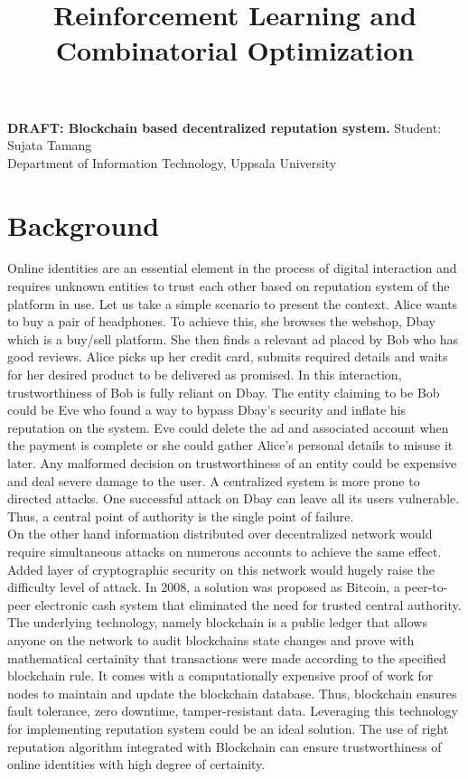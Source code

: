 \documentclass[a4paper,11pt,dvipsnames]{article}
\title{Reinforcement Learning and Combinatorial Optimization}
\begin{document}
	\begin{center}	
		\textbf{\huge{DRAFT: Blockchain based decentralized reputation system.}}
		\newline
		\textsf{\large{Student: Sujata Tamang}}\\
		\textsf{\large{Department of Information Technology, Uppsala University}}
	\end{center}
	
	\section*{Background}
	Online identities are an essential element in the process of digital 
	interaction and requires unknown entities to trust each other based on 
	reputation system of the platform in use. Let us take a simple
	scenario to present the context. Alice wants to buy a pair of 
	headphones. To achieve this, she browses the webshop, Dbay which is 
	a buy/sell platform. She then finds a relevant ad placed by Bob who 
	has good reviews. Alice picks up her credit card, submits required 
	details and waits for her desired product to be delivered as promised. 
	In this interaction, trustworthiness of Bob is fully reliant on Dbay. 
	The entity claiming to be Bob could be Eve who found a way to bypass 
	Dbay’s security and inflate his reputation on the system. Eve could 
	delete the ad and associated account when the payment is complete or 
	she could gather Alice’s personal details to misuse it later. Any 
	malformed decision on trustworthiness of an entity could be expensive 
	and deal severe damage to the user. A centralized system is more 
	prone to directed attacks. One successful attack on Dbay can leave 
	all its users vulnerable. Thus, a central point of authority is the 
	single point of failure.\\
	On the other hand information distributed over decentralized network 
	would require simultaneous attacks on numerous accounts to achieve 
	the same effect. Added layer of cryptographic security on this 
	network would hugely raise the difficulty level of attack. In 2008, 
	a solution was proposed as Bitcoin, a peer-to-peer electronic cash 
	system \cite{Bitcoin_Satoshi} that eliminated the need for trusted central 
	authority. The underlying technology, namely blockchain is a public 
	ledger that allows anyone on the network to audit blockchains state 
	changes and prove with mathematical certainity that transactions were 
	made according to the specified blockchain rule.
	\cite{enoughBitcoinForEthereum} It comes with a computationally expensive 
	proof of work for nodes to maintain and update the blockchain database. 
	Thus, blockchain ensures fault tolerance, zero downtime, tamper-resistant 
	data. Leveraging this technology for implementing reputation system
	could be an ideal solution. The use of right reputation algorithm 
	integrated with Blockchain can ensure trustworthiness of online 
	identities with high degree of certainity.	
	
\end{document}
